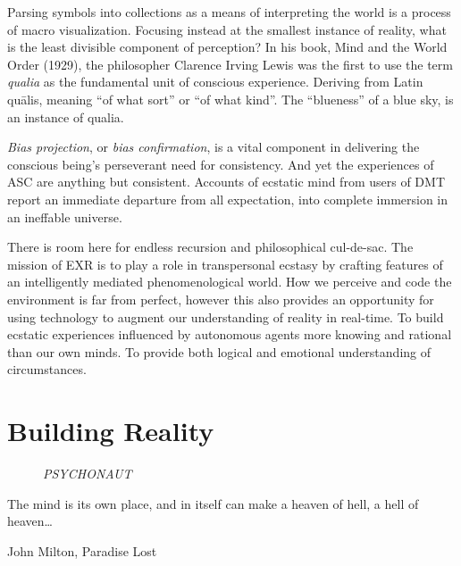 \documentclass{UIdahoMastersThesis}
\begin{document}
Parsing symbols into collections as a means of interpreting the world is a process of macro visualization. Focusing instead at the smallest instance of reality, what is the least divisible component of perception? In his book, Mind and the World Order (1929), the philosopher Clarence Irving Lewis was the first to use the term \emph{qualia} as the fundamental unit of conscious experience. Deriving from Latin qu\={a}lis, meaning ``of what sort'' or ``of what kind''. The ``blueness'' of a blue sky, is an instance of qualia.
 
\emph{Bias projection}, or \emph{bias confirmation}, is a vital component in delivering the conscious being's perseverant need for consistency. And yet the experiences of \ac{ASC} are anything but consistent. Accounts of ecstatic mind from users of DMT report an immediate departure from all expectation, into complete immersion in an ineffable universe.

There is room here for endless recursion and philosophical cul-de-sac. The mission of EXR is to play a role in transpersonal ecstasy by crafting features of an intelligently mediated phenomenological world. How we perceive and code the environment is far from perfect, however this also provides an opportunity for using technology to augment our understanding of reality in real-time. To build ecstatic experiences influenced by autonomous agents more knowing and rational than our own minds. To provide both logical and emotional understanding of circumstances.

\clearpage

\chapter{Building Reality}

\captionsetup{labelformat=empty}
\captionsetup{font=footnotesize}
\begin{figure}[h!]
	\centering
\noindent
{%
\setlength{\fboxsep}{0pt}%
\setlength{\fboxrule}{1.5pt}%
%
}%
	\caption[Art by Kappi, untitled, (Psychonaut)]{\textit{PSYCHONAUT}} 
	\label{fig:ch4}
\end{figure}

\captionsetup{labelformat=simple}
\captionsetup{font=small,labelfont=bf}

\label{Chapter:BuildingReality}
\epigraph {The mind is its own place, and in itself can make a heaven of hell, a hell of heaven\ldots}{John Milton, Paradise Lost}
\end{document}
